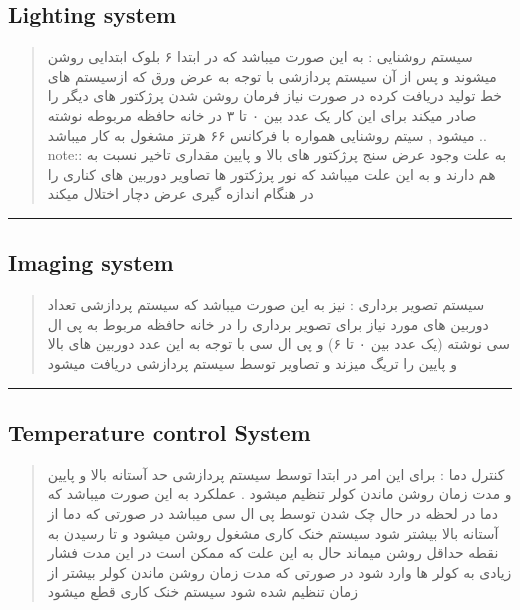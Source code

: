 \documentclass[letterpaper,10pt,english]{sphinxmanual}
\begin{document}
\subsection{Lighting system}
\label{\detokenize{Plc:lighting-system}}
\sphinxAtStartPar
\begin{quote}\begin{farsi}
سیستم روشنایی : به این صورت میباشد که در ابتدا ۶ بلوک ابتدایی روشن میشوند و  پس از آن سیستم پردازشی  با توجه به عرض ورق که ازسیستم های خط تولید دریافت کرده در صورت نیاز فرمان روشن شدن پرژکتور های دیگر را صادر میکند برای این کار یک عدد بین ۰ تا ۳ در خانه حافظه مربوطه نوشته میشود , سیتم روشنایی همواره با فرکانس ۶۶ هرتز مشغول به کار میباشد
.. note::  به علت وجود عرض سنج پرژکتور های بالا و پایین مقداری تاخیر نسبت به هم دارند و به این علت میباشد که نور پرژکتور ها تصاویر دوربین های کناری را در هنگام اندازه گیری عرض دچار اختلال میکند

\end{farsi}\end{quote}
\bigskip\hrule\bigskip



\subsection{Imaging system}
\label{\detokenize{Plc:imaging-system}}
\sphinxAtStartPar
\begin{quote}\begin{farsi}
سیستم تصویر برداری : نیز به این صورت میباشد که سیستم پردازشی تعداد دوربین های مورد نیاز برای تصویر برداری را در خانه حافظه مربوط به پی ال سی نوشته (یک عدد بین ۰ تا ۶) و پی ال سی با توجه به این عدد دوربین های بالا و پایین را تریگ میزند و تصاویر توسط سیستم پردازشی دریافت میشود

\end{farsi}\end{quote}
\bigskip\hrule\bigskip



\subsection{Temperature control System}
\label{\detokenize{Plc:temperature-control-system}}
\sphinxAtStartPar
\begin{quote}\begin{farsi}
کنترل دما : برای این امر در ابتدا توسط سیستم پردازشی حد آستانه بالا و پایین و مدت زمان روشن ماندن کولر تنظیم میشود . عملکرد به این صورت میباشد که دما در لحظه در حال چک شدن توسط پی ال سی میباشد در صورتی که دما از آستانه بالا بیشتر شود سیستم خنک کاری مشغول روشن میشود و تا رسیدن به نقطه حداقل روشن میماند حال به این علت که ممکن است در این مدت فشار زیادی به کولر ها وارد شود در صورتی که مدت زمان روشن ماندن کولر بیشتر از زمان تنظیم شده شود سیستم خنک کاری قطع میشود
\end{farsi}\end{quote}
\sphinxstepscope
\end{document}
